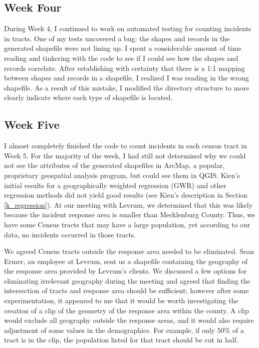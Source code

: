 \documentclass[onecolumn, draftclsnofoot,10pt, compsoc]{IEEEtran}
\begin{document}
\begin{singlespace}
\subsection{Week Four}
During Week 4, I continued to work on automated testing for counting incidents in tracts. One of my tests uncovered a bug: the shapes and records in the generated shapefile were not lining up. I spent a considerable amount of time reading and tinkering with the code to see if I could see how the shapes and records correlate. After establishing with certainty that there is a 1:1 mapping between shapes and records in a shapefile, I realized I was reading in the wrong shapefile. As a result of this mistake, I modified the directory structure to more clearly indicate where each type of shapefile is located.

\subsection{Week Five}
I almost completely finished the code to count incidents in each census tract in Week 5. For the majority of the week, I had still not determined why we could not see the attributes of the generated shapefiles in ArcMap, a popular, proprietary geospatial analysis program, but could see them in QGIS. Kien's initial results for a geographically weighted regression (GWR) and other regression methods did not yield good results (see Kien's description in Section \ref{k_regression}). At our meeting with Levrum, we determined that this was likely because the incident response area is smaller than Mecklenburg County. Thus, we have some Census tracts that may have a large population, yet according to our data, no incidents occurred in those tracts.

We agreed Census tracts outside the response area needed to be eliminated. Sean Ermer, an employee at Levrum, sent us a shapefile containing the geography of the response area provided by Levrum's clients. We discussed a few options for eliminating irrelevant geography during the meeting and agreed that finding the intersection of tracts and response area should be sufficient; however after some experimentation, it appeared to me that it would be worth investigating the creation of a clip of the geometry of the response area within the county. A clip would exclude all geography outside the response areas, and it would also require adjustment of some values in the demographics. For example, if only $50\%$ of a tract is in the clip, the population listed for that tract should be cut in half.


\end{singlespace}
\end{document}
